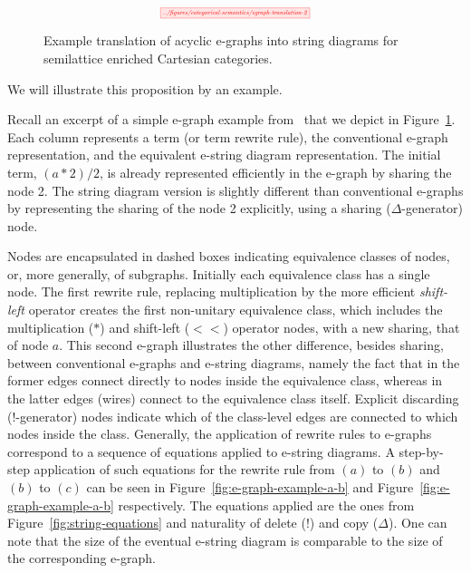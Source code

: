 \documentclass[sigconf, 9pt, nonacm]{acmart}
\begin{document}
\begin{figure}
    \[
        \scalebox{0.5}{
        \tikzfig{../figures/categorical-semantics/egraph-translation-2}
        }
    \]
    \caption{Example translation of acyclic e-graphs into string diagrams for semilattice enriched Cartesian categories. }
    \label{fig:e-graph-example}
\end{figure}

We will illustrate this proposition by an example.
\begin{example}
    Recall an excerpt of a simple e-graph example from~\cite{EggPaper} that we depict in Figure~\ref{fig:e-graph-example}.
    Each column represents a term (or term rewrite rule), the conventional e-graph representation, and the equivalent e-string diagram representation. 
The initial term, $(a*2)/2$, is already represented efficiently in the e-graph by sharing the node 2.
The string diagram version is slightly different than conventional e-graphs by representing the sharing of the node 2 explicitly, using a sharing ($\Delta$-generator) node. 

Nodes are encapsulated in dashed boxes indicating equivalence classes of nodes, or, more generally, of subgraphs. 
Initially each equivalence class has a single node. 
The first rewrite rule, replacing multiplication by the more efficient \emph{shift-left} operator creates the first non-unitary equivalence class, which includes the multiplication ($*$) and shift-left ($<\!\!<$) operator nodes, with a new sharing, that of node $a$. 
This second e-graph illustrates the other difference, besides sharing, between conventional e-graphs and e-string diagrams, namely the fact that in the former edges connect directly to nodes inside the equivalence class, whereas in the latter edges (wires) connect to the equivalence class itself. 
Explicit discarding ($!$-generator) nodes indicate which of the class-level edges are connected to which nodes inside the class. 
Generally, the application of rewrite rules to e-graphs correspond to a sequence of equations applied to e-string diagrams.
A step-by-step application of such equations for the rewrite rule from $(a)$ to $(b)$ and $(b)$ to $(c)$ can be seen in Figure~\ref{fig:e-graph-example-a-b} and Figure~\ref{fig:e-graph-example-a-b} respectively.
The equations applied are the ones from Figure~\ref{fig:string-equations} and naturality of delete ($!$) and copy ($\Delta$).
One can note that the size of the eventual e-string diagram is comparable to the size of the corresponding e-graph.
\end{example}
\end{document}
